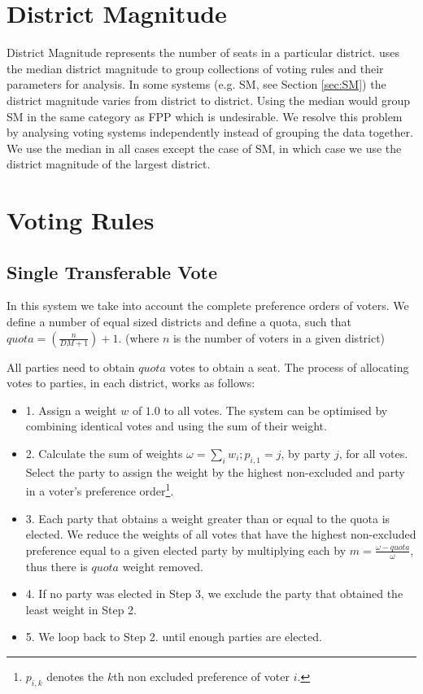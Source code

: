 \documentclass{article}
\begin{document}


\section{District Magnitude}
\label{sec:DM}
District Magnitude represents the number of seats in a particular district. \cite{sweetspot} uses the median district magnitude to group collections of voting rules and their parameters for analysis. In some systems (e.g. SM, see Section \ref{sec:SM}) the district magnitude varies from district to district. Using the median would group SM in the same category as FPP which is undesirable. We resolve this problem by analysing voting systems independently instead of grouping the data together. We use the median in all cases except the case of SM, in which case we use the district magnitude of the largest district.

\section{Voting Rules}
\label{sec:votingrules}
\subsection{Single Transferable Vote}
\label{sec:stv}
In this system we take into account the complete preference orders of voters. We define a number of equal sized districts and define a quota, such that $quota=(\frac{n}{DM+1})+1$. (where $n$ is the number of voters in a given district)

All parties need to obtain $quota$ votes to obtain a seat. The process of allocating votes to parties, in each district, works as follows:

\begin{itemize}
\item 1. Assign a weight $w$ of $1.0$ to all votes. The system can be optimised by combining identical votes and using the sum of their weight.
\item 2. Calculate the sum of weights $\omega = \sum_i{w_i}; p_{i,1}=j$, by party $j$, for all votes. Select the party to assign the weight by the highest non-excluded and party in a voter's preference order\footnote{$p_{i,k}$ denotes the $k$th non excluded preference of voter $i$.}.
\item 3. Each party that obtains a weight greater than or equal to the quota is elected. We reduce the weights of all votes that have the highest non-excluded preference equal to a given elected party by multiplying each by $m = \frac{\omega - quota}{\omega}$, thus there is $quota$ weight removed.
\item 4. If no party was elected in Step 3, we exclude the party that obtained the least weight in Step 2.
\item 5. We loop back to Step 2. until enough parties are elected.
\end{itemize}
\end{document}
